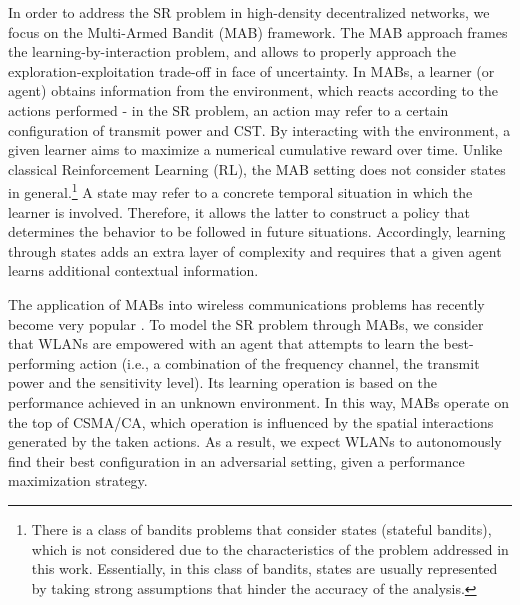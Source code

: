 \documentclass{article}
\begin{document}
In order to address the SR problem in high-density decentralized networks, we focus on the Multi-Armed Bandit (MAB) framework. The MAB approach frames the learning-by-interaction problem, and allows to properly approach the exploration-exploitation trade-off in face of uncertainty. In MABs, a learner (or agent) obtains information from the environment, which reacts according to the actions performed - in the SR problem, an action may refer to a certain configuration of transmit power and CST. By interacting with the environment, a given learner aims to maximize a numerical cumulative reward over time. Unlike classical Reinforcement Learning (RL), the MAB setting does not consider states in general.\footnote{There is a class of bandits problems that consider states (stateful bandits), which is not considered due to the characteristics of the problem addressed in this work. Essentially, in this class of bandits, states are usually represented by taking strong assumptions that hinder the accuracy of the analysis.} A state may refer to a concrete temporal situation in which the learner is involved. Therefore, it allows the latter to construct a policy that determines the behavior to be followed in future situations. Accordingly, learning through states adds an extra layer of complexity and requires that a given agent learns additional contextual information.

The application of MABs into wireless communications problems has recently become very popular \cite{chen2010distributed, maghsudi2015channel, maghsudi2015joint}. To model the SR problem through MABs, we consider that WLANs are empowered with an agent that attempts to learn the best-performing action (i.e., a combination of the frequency channel, the transmit power and the sensitivity level). Its learning operation is based on the performance achieved in an unknown environment. In this way, MABs operate on the top of CSMA/CA, which operation is influenced by the spatial interactions generated by the taken actions. As a result, we expect WLANs to autonomously find their best configuration in an adversarial setting, given a performance maximization strategy.
\end{document}

